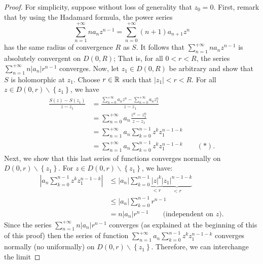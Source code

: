 \begin{proof}
For simplicity, suppose without loss of generality that $z_0 = 0 $. First, remark that 
by using the Hadamard formula, the power series
\[
\sum_{n=1}^{+\infty}  n a_n z^{n-1} = \sum_{n=0}^{+\infty} (n+1) a_{n+1} 
z^n 
\]
has the same radius of convergence $R $ as $S $. It follows that $\sum_{n=1}^{+\infty} n a_n z^{n-1}$ is absolutely
convergent on $D(0, R)$; That is, for all $0 <  r < R$, the series $\sum_{n=1}^{+\infty} n \left| a_n  \right|  r^{n-1}$  converges. 
Now, let $z_1 \in  D(0, R)$ be arbitrary and show that $S $ is holomorphic at $z_1.$ Choose 
$r \in  \mathbb{R}  $ such that $\left| z_1  \right|  <  r < R$. For all $z \in   D(0, r)  \backslash  \left\{ z_1 \right\}$, we have
\begin{align*}
  \frac{S(z) - S(z_1)  }{z - z_1} &= 
  \frac{\sum_{n=0}^{+\infty} a _n z^n  - \sum_{n=0}^{+\infty} a_n z_1^n }{ z - z_1} \\
                                  &= 
                                  \sum_{n=0}^{+\infty} a_n  \frac{z^n - z_1^n }{z - z_1} \\
                                  &= 
                                  \sum_{n=1}^{+\infty} a_n 
                                  \sum_{k=0}^{n-1} z^{k} z_1^{n-1-k}
                                  \\
                                  &= 
                                  \sum_{n=1}^{+\infty } 
                                  a_n  \sum_{k=0}^{n-1} z^k  z_1^{n-1-k} \quad \quad (*). 
\end{align*}
Next, we show that this last series of functions converges normally on $D(0, r) \backslash  \left\{ z_1 \right\} $. For 
$z \in   D(0, r) \backslash \left\{ z_1 \right\} $, 
we have:
\begin{align*}
\left| a_n \sum_{k=0}^{n-1} z^{k} z_1^{n-1-k} \right|  
& \leq 
\left| a_n  \right|  \sum_{k=0}^{n-1} 
\underbrace{\left| z \right| ^k }_{ <  r }
  \underbrace{\left| z_1 \right| ^{n-1-k}}_{ <  r}  \\
& \leq 
\left| a_n  \right|  \sum_{k=0}^{n-1} 
r^{n-1}\\
& = n \left| a_n  \right|  r^{n-1} 
\quad \quad \text{(independent on $z $).}  
\end{align*}
Since the series $\sum_{n=1}^{+\infty} n \left| a_n  \right|  r^{n-1} $ converges (as explained at the beginning of this of
this proof) then the series of function 
$\sum_{n=1}^{+\infty} a_n \sum_{k=0}^{n-1} z^k z_1^{n-1-k} $ converges normally (no uniformally) on $D(0, r)  \backslash  \left\{ z_1 \right\} $. Therefore, we can interchange the limit

\end{proof}
